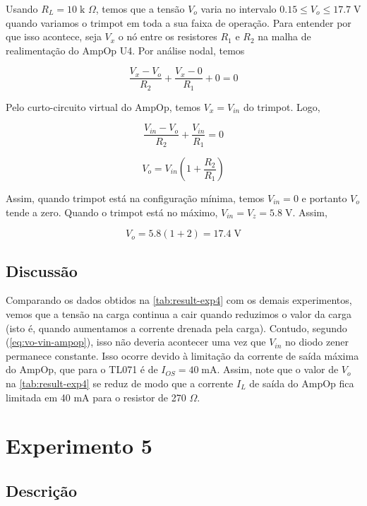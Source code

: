 \documentclass[
	12pt,				%
	oneside,			%
	a4paper,			%
	chapter=TITLE,
	sumario=tradicional,
	english,			%
	brazil				%
]{abntex2}
\newcommand{\un}[1]{\;\text{#1}}
\begin{document}
Usando $R_L = 10 \un{k $\Omega$}$, temos que a tensão $V_o$ varia no intervalo
$0.15 \leq V_o \leq 17.7 \un{V}$ quando variamos o trimpot em toda a sua faixa de operação.
Para entender por que isso acontece, seja $V_x$ o nó entre os resistores $R_1$ e $R_2$ na 
malha de realimentação do AmpOp U4. Por análise nodal, temos  


\[ \frac{V_x - V_o}{R_2} + \frac{V_x - 0}{R_1} + 0 = 0 \]

Pelo curto-circuito virtual do AmpOp, temos $V_x = V_{in}$ do trimpot. Logo,  

\[ \frac{V_{in} - V_o}{R_2} + \frac{V_{in}}{R_1} = 0 \]

\begin{equation}\label{eq:vo-vin-ampop}
	V_o = V_{in} \left( 1 + \frac{R_2}{R_1} \right)
\end{equation}

Assim, quando trimpot está na configuração mínima, temos $V_{in} = 0$ e portanto 
$V_o$ tende a zero. Quando o trimpot está no máximo, $V_{in} = V_z = 5.8 \un{V} $.
Assim, 

\[ V_o = 5.8 \left( 1 + 2 \right) = 17.4 \un{V} \]



\subsection{Discussão}

Comparando os dados obtidos na \autoref{tab:result-exp4} com os demais experimentos, vemos que a tensão na carga continua 
a cair quando reduzimos o valor da carga (isto é, quando aumentamos a corrente drenada pela carga).
Contudo, segundo (\ref{eq:vo-vin-ampop}), isso não deveria acontecer uma vez que $V_{in}$ no diodo zener permanece constante.
Isso ocorre devido à limitação da corrente de saída máxima do AmpOp, que para o TL071 é de $I_{OS} = 40 \un{mA}$.
Assim, note que o valor de $V_o$ na \autoref{tab:result-exp4} se reduz de modo que 
a corrente $I_L$ de saída do AmpOp fica limitada em 40 mA para o resistor de 270 $\Omega$.

\section{Experimento 5}

\subsection{Descrição}
\end{document}
